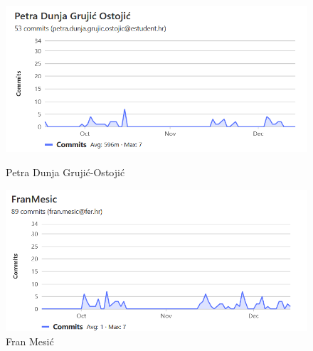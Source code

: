 		\begin{figure}[H]
			\begin{minipage}[t]{0.5\textwidth}
				\includegraphics[width=\linewidth]{slike/Petra.png}
				\caption{Petra Dunja Grujić-Ostojić} \label{fig:Petra}
			\end{minipage}
			\hspace*{\fill}
			\begin{minipage}[t]{0.5\textwidth}
				\includegraphics[width=\linewidth]{slike/FMesic.png}
				\caption{Fran Mesić} \label{fig:Fmesic}
			\end{minipage}
		\end{figure}
		
